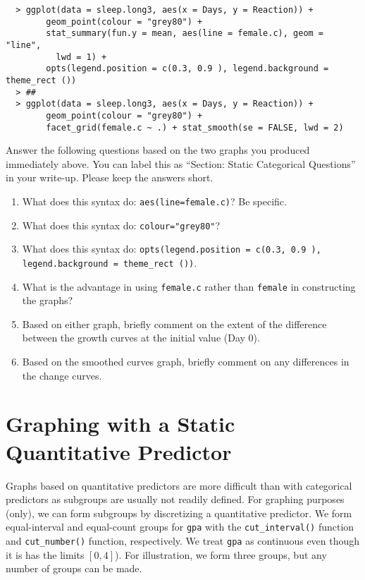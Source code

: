 \documentclass[]{article}
\begin{document}
\begin{verbatim}
  > ggplot(data = sleep.long3, aes(x = Days, y = Reaction)) + 
        geom_point(colour = "grey80") +
        stat_summary(fun.y = mean, aes(line = female.c), geom = "line", 
          lwd = 1) +
        opts(legend.position = c(0.3, 0.9 ), legend.background = theme_rect ())
  > ##
  > ggplot(data = sleep.long3, aes(x = Days, y = Reaction)) + 
        geom_point(colour = "grey80") +
        facet_grid(female.c ~ .) + stat_smooth(se = FALSE, lwd = 2) 
\end{verbatim}

\noindent Answer the following questions based on the two graphs you produced immediately above. You can label this as ``Section: Static Categorical Questions'' in your write-up. Please keep the answers short.

\begin{enumerate}[resume]
\item What does this syntax do: \verb|aes(line=female.c)|? Be specific. 
\item What does this syntax do: \verb|colour="grey80"|?
\item What does this syntax do: \texttt{opts(legend.position = c(0.3, 0.9 ), legend.b\allowbreak ackground = theme\_rect ())}.
\item What is the advantage in using \texttt{female.c} rather than \texttt{female} in constructing the graphs?
\item Based on either graph, briefly comment on the extent of the difference between the growth curves at the initial value (Day 0).
\item Based on the smoothed curves graph, briefly comment on any differences in the change curves.
\end{enumerate}

%
%
\pagebreak
\section*{Graphing with a Static Quantitative Predictor}

\noindent Graphs based on quantitative predictors are more difficult than with categorical predictors as subgroups are usually not readily defined. For graphing purposes (only), we can form subgroups by discretizing a quantitative predictor. We form equal-interval and equal-count groups for \texttt{gpa} with the \verb|cut_interval()| function and \verb|cut_number()| function, respectively. We treat \texttt{gpa} as continuous even though it is has the limits $[0,4]$). For illustration, we form three groups, but any number of groups can be made.
\end{document}
